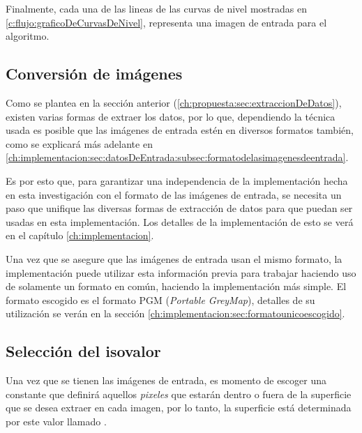 Finalmente, cada una de las lineas de las curvas de nivel mostradas en \ref{c:flujo:graficoDeCurvasDeNivel}, representa una imagen de entrada para el algoritmo.

\subsection{Conversión de imágenes}
\label{ch:propuesta:sec:conversionDeImagenes}

Como se plantea en la sección anterior (\ref{ch:propuesta:sec:extraccionDeDatos}), existen varias formas de extraer los datos, por lo que, dependiendo la técnica usada es posible que las imágenes de entrada estén en diversos formatos también, como se explicará más adelante en \ref{ch:implementacion:sec:datosDeEntrada:subsec:formatodelasimagenesdeentrada}.

Es por esto que, para garantizar una independencia de la implementación hecha en esta investigación con el formato de las imágenes de entrada, se necesita un paso que unifique las diversas formas de extracción de datos para que puedan ser usadas en esta implementación.
Los detalles de la implementación de esto se verá en el capítulo \ref{ch:implementacion}.

Una vez que se asegure que las imágenes de entrada usan el mismo formato, la implementación puede utilizar esta información previa para trabajar haciendo uso de solamente un formato en común, haciendo la implementación más simple. El formato escogido es el formato PGM (\emph{Portable GreyMap}), detalles de su utilización se verán en la sección \ref{ch:implementacion:sec:formatounicoescogido}.

\subsection{Selección del isovalor}
\label{ch:propuesta:sec:seleccionDelIsovalor}

Una vez que se tienen las imágenes de entrada, es momento de escoger una constante que definirá aquellos \emph{pixeles} que estarán dentro o fuera de la superficie que se desea extraer en cada imagen, por lo tanto, la superficie está determinada por este valor llamado .

